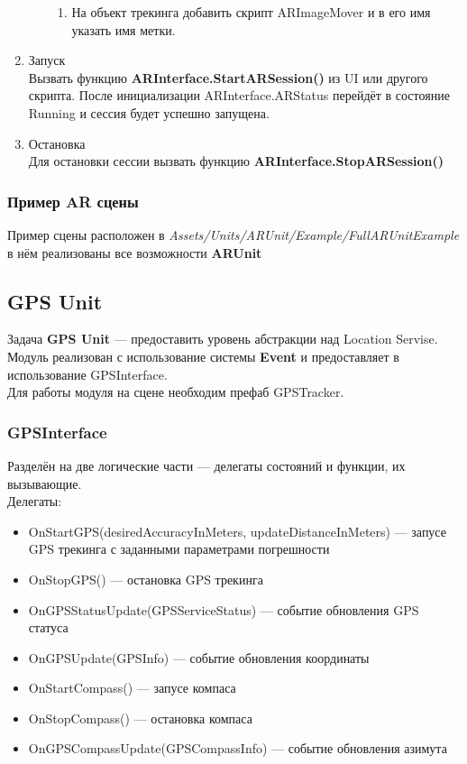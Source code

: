\documentclass[a4paper, 11pt, titlepage]{article}
\begin{document}
\begin{enumerate}
\begin{enumerate}
\begin{enumerate}
                  \item На объект трекинга добавить скрипт ARImageMover и в его имя указать имя метки.
                \end{enumerate}
              \end{enumerate}
            \item Запуск \\
              Вызвать функцию \textbf{ARInterface.StartARSession()} из UI или другого скрипта. После инициализации ARInterface.ARStatus 
              перейдёт в состояние Running и сессия будет успешно запущена.
            \item Остановка \\
              Для остановки сессии вызвать функцию \textbf{ARInterface.StopARSession()}
        \end{enumerate}
      
      \subsubsection{Пример AR сцены}
        Пример сцены расположен в \textit{Assets/Units/ARUnit/Example/FullARUnitExample} в нём реализованы все возможности \textbf{ARUnit}

    \subsection{GPS Unit}
      Задача \textbf{GPS Unit} --- предоставить уровень абстракции над Location Servise.\\
      Модуль реализован с использование системы \textbf{Event} и предоставляет в использование GPSInterface.\\
      Для работы модуля на сцене необходим префаб GPSTracker.
    \subsubsection{GPSInterface}
      Разделён на две логические части --- делегаты состояний и функции, их вызывающие. \\
      Делегаты:
      \begin{itemize}
        \item OnStartGPS(desiredAccuracyInMeters, updateDistanceInMeters) --- запусе GPS трекинга
        с заданными параметрами погрешности
        \item OnStopGPS() --- остановка GPS трекинга
        \item OnGPSStatusUpdate(GPSServiceStatus) --- событие обновления GPS статуса 
        \item OnGPSUpdate(GPSInfo) --- событие обновления координаты 
        \item OnStartCompass() --- запусе компаса
        \item OnStopCompass() --- остановка компаса
        \item OnGPSCompassUpdate(GPSCompassInfo) --- событие обновления азимута
      \end{itemize}
\end{document}

